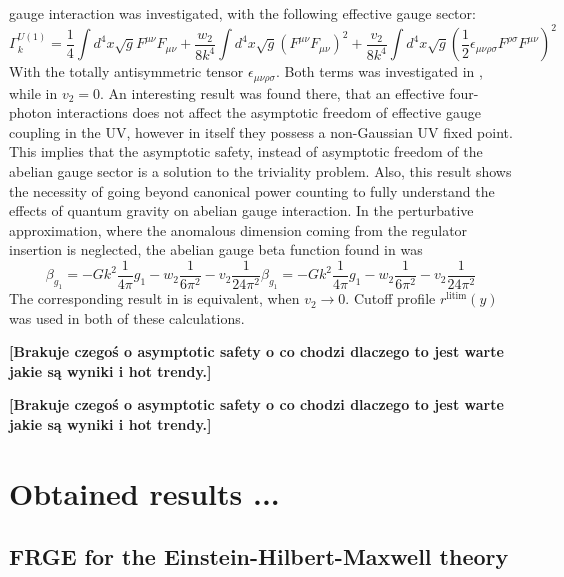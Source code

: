 \documentclass[11pt, a4paper]{article}
\newcommand{\jhkbf}[1]{\textbf{\color{red} [#1]}}
\newcommand{\jhkbf}[1]{\textbf{\color{red} [#1]}}
\begin{document}
gauge interaction was investigated, with the following effective gauge sector:
\begin{equation}
    \Gamma^{U(1)}_k = \frac{1}{4} \int d^4 x \sqrt{g} F^{\mu\nu} F_{\mu\nu} + \frac{w_2}{8 k^4} \int d^4 x \sqrt{g} \left(F^{\mu\nu} F_{\mu\nu}\right)^2 + \frac{v_2}{8k^4} \int d^4 x \sqrt{g} \left( \frac{1}{2} \epsilon_{\mu\nu\rho\sigma} F^{\rho\sigma} F^{\mu\nu} \right)^2
\end{equation}
With the totally antisymmetric tensor $\epsilon_{\mu\nu\rho\sigma}$.
Both terms was investigated in \cite{kwapisz_eichhorn}, while in \cite{christiansen_eichhorn} $v_2 = 0$.
An interesting result was found there, that an effective four-photon interactions does not affect the asymptotic freedom of effective gauge coupling
in the UV, however in itself they possess a non-Gaussian UV fixed point. This implies that the asymptotic safety, instead of asymptotic freedom
of the abelian gauge sector is a solution to the triviality problem. Also, this result shows
the necessity of going beyond canonical power counting to fully understand the effects of quantum gravity on abelian gauge interaction.
In the perturbative approximation, where the anomalous dimension coming from the regulator insertion is neglected,
the abelian gauge beta function found in \cite{kwapisz_eichhorn} was
\begin{equation}
    \beta_{g_1} = - Gk^2 \frac{1}{4\pi} g_1 - w_2 \frac{1}{6\pi^2} - v_2 \frac{1}{24\pi^2}
    \beta_{g_1} = - Gk^2 \frac{1}{4\pi} g_1 - w_2 \frac{1}{6\pi^2} - v_2 \frac{1}{24\pi^2}
\end{equation}
The corresponding result in \cite{christiansen_eichhorn} is equivalent, when $v_2 \rightarrow 0$.
Cutoff profile $r^{\text{litim}}(y)$ was used in both of these calculations.

\jhkbf{Brakuje czegoś o asymptotic safety o co chodzi dlaczego to jest warte jakie są wyniki i hot trendy.}

\jhkbf{Brakuje czegoś o asymptotic safety o co chodzi dlaczego to jest warte jakie są wyniki i hot trendy.}

\section{Obtained results ...}

\subsection{FRGE for the Einstein-Hilbert-Maxwell theory}
\end{document}
